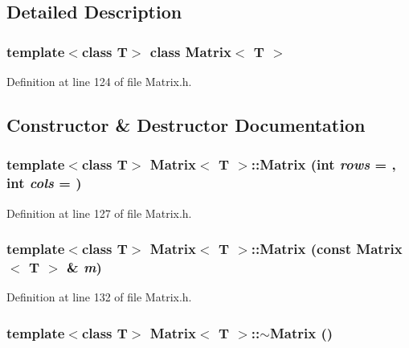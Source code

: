 \subsection{Detailed Description}
\subsubsection*{template$<$class T$>$ class Matrix$<$ T $>$}



Definition at line 124 of file Matrix.h.



\subsection{Constructor \& Destructor Documentation}
\hypertarget{classMatrix_a3ebbc04812668005b87e5c0cf28fa4ac}{
\subsubsection[{Matrix}]{\setlength{\rightskip}{0pt plus 5cm}template$<$class T$>$ {\bf Matrix}$<$ T $>$::{\bf Matrix} (int {\em rows} = {}, \/  int {\em cols} = {})}}
\label{classMatrix_a3ebbc04812668005b87e5c0cf28fa4ac}


Definition at line 127 of file Matrix.h.

\hypertarget{classMatrix_a3796b4f32dc8e11f908a90fd3dd39c45}{
\subsubsection[{Matrix}]{\setlength{\rightskip}{0pt plus 5cm}template$<$class T$>$ {\bf Matrix}$<$ T $>$::{\bf Matrix} (const {\bf Matrix}$<$ T $>$ \& {\em m})}}
\label{classMatrix_a3796b4f32dc8e11f908a90fd3dd39c45}


Definition at line 132 of file Matrix.h.

\hypertarget{classMatrix_a91aa704de674203e96aece9e1955ccd3}{
\subsubsection[{$\sim$Matrix}]{\setlength{\rightskip}{0pt plus 5cm}template$<$class T$>$ {\bf Matrix}$<$ T $>$::$\sim${\bf Matrix} ()}}
\label{classMatrix_a91aa704de674203e96aece9e1955ccd3}


